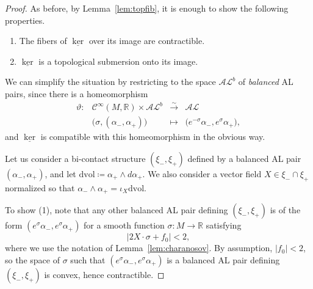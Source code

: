 \documentclass[letterpaper, 11pt]{article}
\numberwithin{equation}{section}
\newcommand{\R}{\mathbb{R}}
\begin{document}
\begin{proof}
As before, by Lemma~\ref{lem:topfib}, it is enough to show the following properties.
\begin{enumerate}[label=(\arabic*)]
\item The fibers of $\underline{\ker}$ over its image are contractible.
\item $\underline{\ker}$ is a topological submersion onto its image.
\end{enumerate}

We can simplify the situation by restricting to the space $\mathcal{AL}^b$ of \emph{balanced} AL pairs, since there is a homeomorphism
$$\begin{array}{rccc} \label{eq:homeoAL} 
\vartheta: & \mathcal{C}^\infty(M, \R) \times \mathcal{AL}^b & \overset{\sim}{\longrightarrow} & \mathcal{AL}\\
& \big(\sigma, (\alpha_-, \alpha_+)\big) & \longmapsto & \big(e^{-\sigma} \alpha_-,  e^\sigma \alpha_+\big),
\end{array}$$
and $\underline{\ker}$ is compatible with this homeomorphism in the obvious way.

Let us consider a bi-contact structure $(\xi_-, \xi_+)$ defined by a balanced AL pair $(\alpha_-, \alpha_+)$, and let $\mathrm{dvol} \coloneqq \alpha_+ \wedge d\alpha_+$. We also consider a vector field $X \in \xi_- \cap \xi_+$ normalized so that $\alpha_- \wedge \alpha_+ = \iota_X \mathrm{dvol}$.

To show (1), note that any other balanced AL pair defining $(\xi_-, \xi_+)$ is of the form $(e^\sigma \alpha_-, e^\sigma \alpha_+)$ for a smooth function $\sigma : M \rightarrow \R$ satisfying $$ \vert 2 X\cdot \sigma + f_0 \vert<2,$$
where we use the notation of Lemma~\ref{lem:charanosov}. By assumption, $\vert f_0 \vert < 2$, so the space of $\sigma$ such that $(e^\sigma \alpha_-, e^\sigma \alpha_+)$ is a balanced AL pair defining $(\xi_-, \xi_+)$ is convex, hence contractible.


\end{proof}
\end{document}
